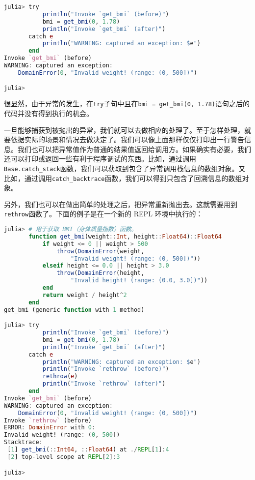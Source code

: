 \begin{lstlisting}[language=julia]
julia> try 
           println("Invoke `get_bmi` (before)")
           bmi = get_bmi(0, 1.78)
           println("Invoke `get_bmi` (after)")
       catch e
           println("WARNING: captured an exception: $e")
       end
Invoke `get_bmi` (before)
WARNING: captured an exception: 
    DomainError(0, "Invalid weight! (range: (0, 500])")

julia> 
\end{lstlisting}

很显然，由于异常的发生，在\verb`try`子句中且在\verb`bmi = get_bmi(0, 1.78)`语句之后的代码并没有得到执行的机会。

一旦能够捕获到被抛出的异常，我们就可以去做相应的处理了。至于怎样处理，就要依据实际的场景和情况去做决定了。我们可以像上面那样仅仅打印出一行警告信息。我们也可以把异常值作为普通的结果值返回给调用方。如果确实有必要，我们还可以打印或返回一些有利于程序调试的东西。比如，通过调用\verb`Base.catch_stack`函数，我们可以获取到包含了异常调用栈信息的数组对象。又比如，通过调用\verb`catch_backtrace`函数，我们可以得到只包含了回溯信息的数组对象。

另外，我们也可以在做出简单的处理之后，把异常重新抛出去。这就需要用到\verb`rethrow`函数了。下面的例子是在一个新的 REPL 环境中执行的：

\begin{lstlisting}[language=julia]
julia> # 用于获取 BMI（身体质量指数）函数。
       function get_bmi(weight::Int, height::Float64)::Float64
           if weight <= 0 || weight > 500
               throw(DomainError(weight, 
                   "Invalid weight! (range: (0, 500])"))
           elseif height <= 0.0 || height > 3.0
               throw(DomainError(height, 
                   "Invalid height! (range: (0.0, 3.0])"))
           end
           return weight / height^2
       end
get_bmi (generic function with 1 method)

julia> try 
           println("Invoke `get_bmi` (before)")
           bmi = get_bmi(0, 1.78)
           println("Invoke `get_bmi` (after)")
       catch e
           println("WARNING: captured an exception: $e")
           println("Invoke `rethrow` (before)")
           rethrow(e)
           println("Invoke `rethrow` (after)")
       end
Invoke `get_bmi` (before)
WARNING: captured an exception: 
    DomainError(0, "Invalid weight! (range: (0, 500])")
Invoke `rethrow` (before)
ERROR: DomainError with 0:
Invalid weight! (range: (0, 500])
Stacktrace:
 [1] get_bmi(::Int64, ::Float64) at ./REPL[1]:4
 [2] top-level scope at REPL[2]:3

julia> 
\end{lstlisting}

